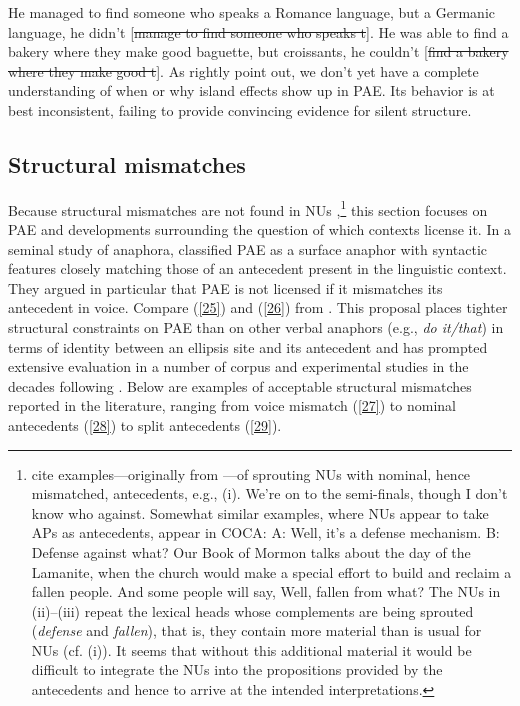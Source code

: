 \documentclass[output=paper
                ,modfonts
                ,nonflat
	        ,collection
	        ,collectionchapter
	        ,collectiontoclongg
 	        ,biblatex
                ,babelshorthands
                ,newtxmath
                ,draftmode
                ,colorlinks, citecolor=brown
]{./langsci/langscibook}
\begin{document}
{\ea He managed to find someone who speaks a Romance language, but a Germanic language, he didn't [\sout{manage to find someone who speaks t}].\label{23}\z
\ea He was able to find a bakery where they make good baguette, but croissants, he couldn't [\sout{find a bakery where they make good t}].\label{24}\z
As \citet{Ginzburg2018} rightly point out, we don't yet have a complete understanding of when or why island effects show up in PAE. Its behavior is at best inconsistent, failing to provide convincing evidence for silent structure.


\subsection{Structural mismatches}
\label{sec-structural-mismatches}

Because structural mismatches are not found in NUs \citep[see][]{Merchant2005a, Merchant2013},\footnote{\citet{Ginzburg2018} cite examples---originally from \citet{Beecher2008}---of sprouting NUs with nominal, hence mismatched, antecedents, e.g., (i).
	\ea We're on to the semi-finals, though I don't know who against.\z
	Somewhat similar examples, where NUs appear to take APs as antecedents, appear in COCA:
	\ea  A: Well, it's a defense mechanism. B: Defense against what?\z
	\ea Our Book of Mormon talks about the day of the Lamanite, when the church would make a special effort to build and reclaim a fallen people. And some people will say, Well, fallen from what? \z
	The NUs in (ii)--(iii) repeat the lexical heads whose complements are being sprouted (\textit{defense} and \textit{fallen}), that is, they contain more material than is usual for NUs (cf. (i)). It seems that without this additional material it would be difficult to integrate the NUs into the propositions provided by the antecedents and hence to arrive at the intended interpretations.
} this section focuses on PAE and developments surrounding the question of which contexts license it. In a seminal study of anaphora, \citet{Hankamer1976} classified PAE as a surface anaphor with syntactic features closely matching those of an antecedent present in the linguistic context. They argued in particular that PAE is not licensed if it mismatches its antecedent in voice. Compare (\ref{25}) and (\ref{26}) from \citet[327]{Hankamer1976}.
\z
{}
\z
This proposal places tighter structural constraints on PAE than on other verbal anaphors (e.g., \textit{do it/that}) in terms of identity between an ellipsis site and its antecedent and has prompted extensive evaluation in a number of corpus and experimental studies in the decades following \citet{Hankamer1976}. Below are examples of acceptable structural mismatches reported in the literature, ranging from voice mismatch (\ref{27}) to nominal antecedents (\ref{28}) to split antecedents (\ref{29}).

}
\end{document}
